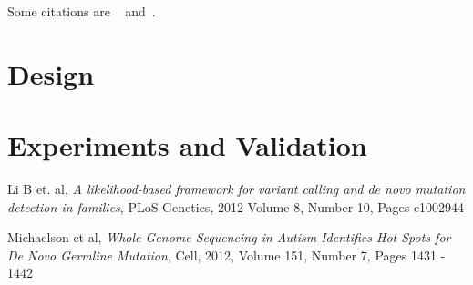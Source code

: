 \documentclass{article}
\begin{document}
Some citations are ~\cite{Li2012} and~\cite{Michaelson2012}.

\section{Design}

\section{Experiments and Validation}

\begin{thebibliography}{10}

   Li B et. al,
   \emph{A likelihood-based framework for variant calling and de novo mutation detection in families},
   PLoS Genetics, 2012
   Volume 8, Number 10, Pages e1002944

   Michaelson et al,
   \emph{Whole-Genome Sequencing in Autism Identifies Hot Spots for De Novo Germline Mutation},  
   Cell, 2012, 
   Volume 151, Number 7, Pages 1431 - 1442

\end{thebibliography}
\end{document}
